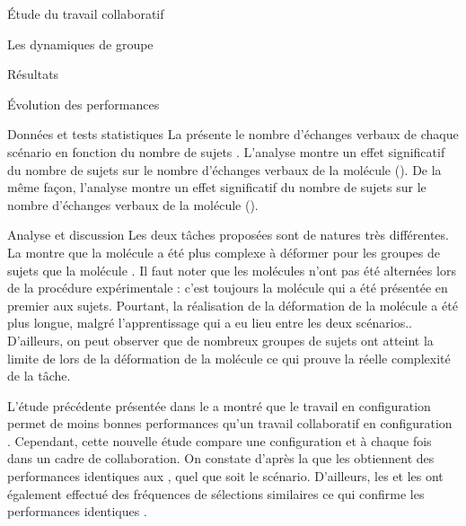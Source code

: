 \documentclass[myfrancais]{mythesis}
\begin{document}
\begin{mypart}{Étude du travail collaboratif}
\begin{mychapter}{Les dynamiques de groupe}
\begin{mysection}{Résultats}
\begin{mysubsection}{Évolution des performances}
\begin{mysubsubsection}{Données et tests statistiques}
						La  présente le nombre d'échanges verbaux  de chaque scénario  en fonction du nombre de sujets .
						L'analyse montre un effet significatif du nombre de sujets  sur le nombre d'échanges verbaux  de la molécule \myPrion ().
						De la même façon, l'analyse montre un effet significatif du nombre de sujets  sur le nombre d'échanges verbaux  de la molécule \myUbiquitin ().
					\end{mysubsubsection}
					\begin{mysubsubsection}{Analyse et discussion}
						Les deux tâches proposées sont de natures très différentes.
						La  montre que la molécule \myUbiquitin a été plus complexe à déformer pour les groupes de sujets que la molécule \myPrion.
						Il faut noter que les molécules n'ont pas été alternées lors de la procédure expérimentale  : c'est toujours la molécule \myPrion qui a été présentée en premier aux sujets.
						Pourtant, la réalisation de la déformation de la molécule \myUbiquitin a été plus longue, malgré l'apprentissage qui a eu lieu entre les deux scénarios..
						D'ailleurs, on peut observer que de nombreux groupes de sujets ont atteint la limite de  lors de la déformation de la molécule \myUbiquitin ce qui prouve la réelle complexité de la tâche.

						L'étude précédente présentée dans le  a montré que le travail en configuration  permet de moins bonnes performances qu'un travail collaboratif en configuration .
						Cependant, cette nouvelle étude compare une configuration  et  à chaque fois dans un cadre de collaboration.
						On constate d'après la  que les  obtiennent des performances identiques aux , quel que soit le scénario.
						D'ailleurs, les  et les  ont également effectué des fréquences de sélections similaires ce qui confirme les performances identiques .


\end{mysubsubsection}
\end{mysubsection}
\end{mysection}
\end{mychapter}
\end{mypart}
\end{document}
